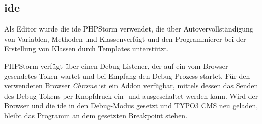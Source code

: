 
\subsection{\gls{ide}}
Als Editor wurde die \gls{ide} PHPStorm verwendet, die über Autovervollständigung von Variablen, Methoden und Klassenverfügt und den Programmierer bei der Erstellung von Klassen durch Templates unterstützt.

PHPStorm verfügt über einen Debug Listener, der auf ein vom Browser gesendetes Token wartet und bei Empfang den Debug Prozess startet. Für den verwendeten Browser \textit{Chrome} ist ein Addon verfügbar, mittels dessen das Senden des Debug-Tokens per Knopfdruck ein- und ausgeschaltet werden kann. Wird der Browser und die \gls{ide} in den Debug-Modus gesetzt und TYPO3 CMS neu geladen, bleibt das Programm an dem gesetzten Breakpoint stehen.
